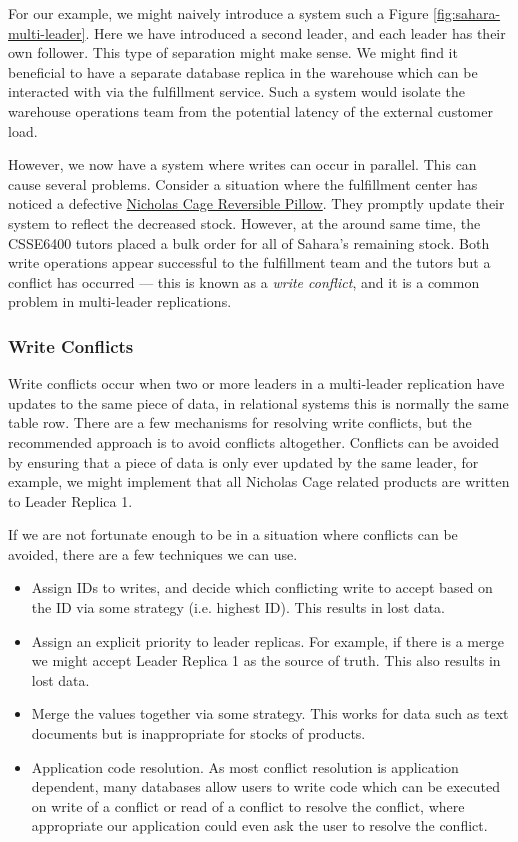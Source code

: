 For our example,
we might naively introduce a system such a Figure \ref{fig:sahara-multi-leader}.
Here we have introduced a second leader,
and each leader has their own follower.
This type of separation might make sense.
We might find it beneficial to have a separate database replica in the warehouse which can be interacted with via the fulfillment service.
Such a system would isolate the warehouse operations team from the potential latency of the external customer load.

However, we now have a system where writes can occur in parallel.
This can cause several problems.
Consider a situation where the fulfillment center has noticed a defective \href{https://www.amazon.com.au/dp/B09LYDDDR1}{Nicholas Cage Reversible Pillow}.
They promptly update their system to reflect the decreased stock.
However, at the around same time,
the CSSE6400 tutors placed a bulk order for all of Sahara's remaining stock.
Both write operations appear successful to the fulfillment team and the tutors but a conflict has occurred --- this is known as a \textsl{write conflict},
and it is a common problem in multi-leader replications. 

\subsubsection*{Write Conflicts}
Write conflicts occur when two or more leaders in a multi-leader replication have updates to the same piece of data,
in relational systems this is normally the same table row.
There are a few mechanisms for resolving write conflicts,
but the recommended approach is to avoid conflicts altogether.
Conflicts can be avoided by ensuring that a piece of data is only ever updated by the same leader,
for example, we might implement that all Nicholas Cage related products are written to Leader Replica 1.

If we are not fortunate enough to be in a situation where conflicts can be avoided,
there are a few techniques we can use.

\begin{itemize}
    \item Assign IDs to writes, and decide which conflicting write to accept based on the ID via some strategy (i.e. highest ID). This results in lost data.
    \item Assign an explicit priority to leader replicas. For example, if there is a merge we might accept Leader Replica 1 as the source of truth. This also results in lost data.
    \item Merge the values together via some strategy. This works for data such as text documents but is inappropriate for stocks of products.
    \item Application code resolution. As most conflict resolution is application dependent, many databases allow users to write code which can be executed on write of a conflict or read of a conflict to resolve the conflict, where appropriate our application could even ask the user to resolve the conflict.
\end{itemize}

